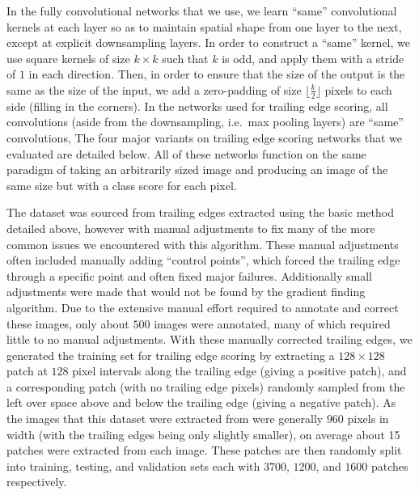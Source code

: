 In the fully convolutional networks that we use, we learn ``same'' convolutional kernels at each layer so as to maintain spatial shape from one layer to the next, except at explicit downsampling layers.
In order to construct a ``same'' kernel, we use square kernels of size $k \times k$ such that $k$ is odd, and apply them with a stride of $1$ in each direction.
Then, in order to ensure that the size of the output is the same as the size of the input, we add a zero-padding of size $\lfloor \frac{k}{2} \rfloor$ pixels to each side (filling in the corners).
In the networks used for trailing edge scoring, all convolutions (aside from the downsampling, i.e.\ max pooling layers) are ``same'' convolutions,
The four major variants on trailing edge scoring networks that we evaluated are detailed below.
All of these networks function on the same paradigm of taking an arbitrarily sized image and producing an image of the same size but with a class score for each pixel.

The dataset was sourced from trailing edges extracted using the basic method detailed above, however with manual adjustments to fix many of the more common issues we encountered with this algorithm.
These manual adjustments often included manually adding ``control points'', which forced the trailing edge through a specific point and often fixed major failures.
Additionally small adjustments were made that would not be found by the gradient finding algorithm.
Due to the extensive manual effort required to annotate and correct these images, only about $500$ images were annotated, many of which required little to no manual adjustments.
With these manually corrected trailing edges, we generated the training set for trailing edge scoring by extracting a $128 \times 128$ patch at $128$ pixel intervals along the trailing edge (giving a positive patch), and a corresponding patch (with no trailing edge pixels) randomly sampled from the left over space above and below the trailing edge (giving a negative patch).
As the images that this dataset were extracted from were generally $960$ pixels in width (with the trailing edges being only slightly smaller), on average about 15 patches were extracted from each image. 
These patches are then randomly split into training, testing, and validation sets each with $3700$, $1200$, and $1600$ patches respectively.


